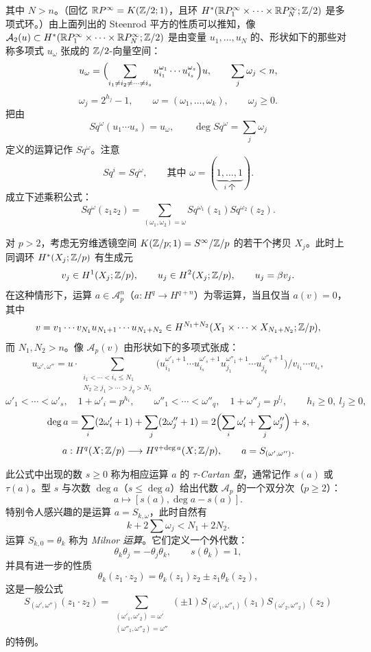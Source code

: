 其中 $N>n$。（回忆 $\mathbb{R}P^\infty=K(\mathbb{Z}/2;1)$，且环 $H^*(\mathbb{R}P^\infty_1\times\cdots\times\mathbb{R}P^\infty_N;\mathbb{Z}/2)$ 是多项式环。）由上面列出的 Steenrod 平方的性质可以推知，像 $\mathcal{A}_2(u)\subset H^*(\mathbb{R}P^\infty_1\times\cdots\times\mathbb{R}P^\infty_N;\mathbb{Z}/2)$ 是由变量 $u_1,\dots,u_N$ 的、形状如下的那些对称多项式 $u_\omega$ 张成的 $\mathbb{Z}/2$-向量空间：
\[
u_\omega=\Bigl(\sum_{i_1\ne i_2\ne\cdots\ne i_s}u^{\omega_1}_{i_1}\cdots u^{\omega_s}_{i_s}\Bigr)u,\qquad \sum_j\omega_j<n,
\]
\[
\omega_j=2^{h_j}-1,\qquad \omega=(\omega_1,\dots,\omega_k),\qquad \omega_j\ge 0.
\]
把由
\begin{equation}
Sq^\omega(u_1\cdots u_s)=u_\omega,\qquad \deg Sq^\omega=\sum_j\omega_j \tag{6.11}
\end{equation}
定义的运算记作 $Sq^\omega$。注意
\[
Sq^i=Sq^\omega,\qquad\text{其中 } \omega=(\underbrace{1,\dots,1}_{i\text{ 个}}).
\]
成立下述乘积公式：
\[
Sq^\omega(z_1z_2)=\sum_{(\omega_1,\omega_2)=\omega}Sq^{\omega_1}(z_1)Sq^{\omega_2}(z_2).
\]


对 $p>2$，考虑无穷维透镜空间 $K(\mathbb{Z}/p;1)=S^\infty/\mathbb{Z}/p$ 的若干个拷贝 $X_j$。此时上同调环 $H^*(X_j;\mathbb{Z}/p)$ 有生成元
\[
v_j\in H^1(X_j;\mathbb{Z}/p),\qquad u_j\in H^2(X_j;\mathbb{Z}/p),\qquad u_j=\beta v_j.
\]
在这种情形下，运算 $a\in\mathcal{A}^n_p$（$a:H^q\to H^{q+n}$）为零运算，当且仅当 $a(v)=0$，其中
\[
v=v_1\cdots v_{N_1}u_{N_1+1}\cdots u_{N_1+N_2}\in H^{N_1+N_2}(X_1\times\cdots\times X_{N_1+N_2};\mathbb{Z}/p),
\]
而 $N_1,N_2>n$。像 $\mathcal{A}_p(v)$ 由形状如下的多项式张成：
\[
u_{\omega',\omega''}=u\cdot\!\!\sum_{\substack{i_1<\cdots<i_s\le N_1\\ N_2\ge j_1>\cdots>j_q>N_1}}\!\!\bigl(u^{\omega'_1+1}_{i_1}\cdots u^{\omega'_s+1}_{i_s}u^{\omega''_1+1}_{j_1}\cdots u^{\omega''_q+1}_{j_q}\bigr)/v_{i_1}\cdots v_{i_s},
\]
\[
\omega'_1<\cdots<\omega'_s,\quad 1+\omega'_i=p^{h_i},\qquad \omega''_1<\cdots<\omega''_q,\quad 1+\omega''_j=p^{l_j},\qquad h_i\ge 0,\ l_j\ge 0,
\]
\[
\deg a=\sum_i(2\omega'_i+1)+\sum_j(2\omega''_j+1)=2\Bigl(\sum_i\omega'_i+\sum_j\omega''_j\Bigr)+s,
\]
\[
a:H^q(X;\mathbb{Z}/p)\longrightarrow H^{q+\deg a}(X;\mathbb{Z}/p),\qquad a=S_{(\omega',\omega'')}.
\]

此公式中出现的数 $s\ge 0$ 称为相应运算 $a$ 的 \emph{$\tau$-Cartan 型}，通常记作 $s(a)$ 或 $\tau(a)$。型 $s$ 与次数 $\deg a$（$s\le\deg a$）给出代数 $\mathcal{A}_p$ 的一个双分次（$p\ge 2$）：
\[
a\longmapsto[s(a),\deg a-s(a)].
\]
特别令人感兴趣的是运算 $a=S_{k,\omega}$，此时自然有
\[
k+2\sum\omega_j<N_1+2N_2.
\]
运算 $S_{k,0}=\theta_k$ 称为 \emph{Milnor 运算}。它们定义一个外代数：
\[
\theta_k\theta_j=-\theta_j\theta_k,\qquad s(\theta_k)=1,
\]
并具有进一步的性质
\[
\theta_k(z_1\cdot z_2)=\theta_k(z_1)z_2\pm z_1\theta_k(z_2),
\]
这是一般公式
\[
S_{(\omega',\omega'')}(z_1\cdot z_2)=\sum_{\substack{(\omega'_1,\omega'_2)=\omega'\\ (\omega''_1,\omega''_2)=\omega''}}(\pm 1)S_{(\omega'_1,\omega''_1)}(z_1)S_{(\omega'_2,\omega''_2)}(z_2)
\]
的特例。

